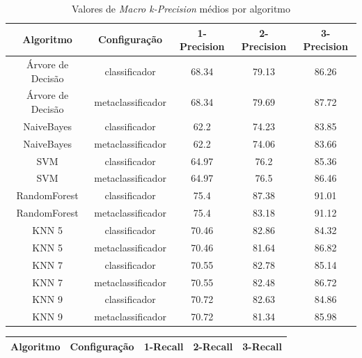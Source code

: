 {\begin{table}[h!]
  \begin{center}
    \resizebox{\textwidth}{!} {
    \begin{tabular}{ccccc}
      \hline
      \textbf{Algoritmo} & \textbf{Configuração} & \textbf{1-Precision} & \textbf{2-Precision} & \textbf{3-Precision}\\
      \hline

Árvore de Decisão	&	classificador	&	68.34	&	79.13	&	86.26	\\
Árvore de Decisão	&	metaclassificador	&	68.34	&	79.69	&	87.72	\\
NaiveBayes	&	classificador	&	62.2	&	74.23	&	83.85	\\
NaiveBayes	&	metaclassificador	&	62.2	&	74.06	&	83.66	\\
SVM	&	classificador	&	64.97	&	76.2	&	85.36	\\
SVM	&	metaclassificador	&	64.97	&	76.5	&	86.46	\\
RandomForest	&	classificador	&	75.4	&	87.38	&	91.01	\\
RandomForest	&	metaclassificador	&	75.4	&	83.18	&	91.12	\\
KNN 5	&	classificador	&	70.46	&	82.86	&	84.32	\\
KNN 5	&	metaclassificador	&	70.46	&	81.64	&	86.82	\\
KNN 7	&	classificador	&	70.55	&	82.78	&	85.14	\\
KNN 7	&	metaclassificador	&	70.55	&	82.48	&	86.72	\\
KNN 9	&	classificador	&	70.72	&	82.63	&	84.86	\\
KNN 9	&	metaclassificador	&	70.72	&	81.34	&	85.98	\\

      \hline
    \end{tabular}
    }
    \caption{Valores de \textit{Macro k-Precision} médios por algoritmo}
    \label{tab:prec}
  \end{center}
\end{table}

\begin{table}[h!]
  \begin{center}
    \resizebox{\textwidth}{!} {
    \begin{tabular}{ccccc}
      \hline
      \textbf{Algoritmo} & \textbf{Configuração} & \textbf{1-Recall} & \textbf{2-Recall} & \textbf{3-Recall}\\
      \hline



\end{tabular}}
\end{center}
\end{table}}
